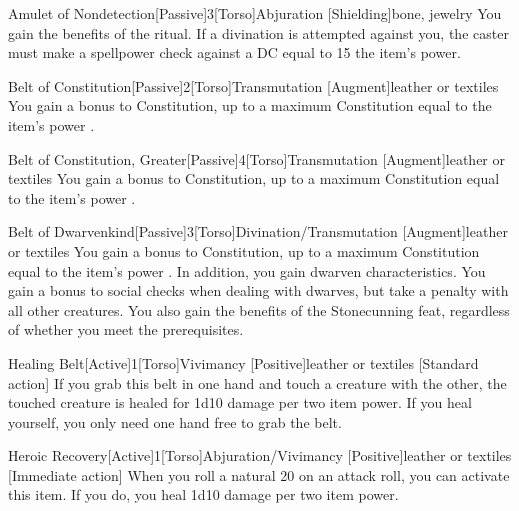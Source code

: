 \begin{magicitemdef}{Amulet of Nondetection}[Passive]{3}[Torso]{Abjuration [Shielding]}{bone, jewelry}
     You gain the benefits of the  ritual.
    If a divination is attempted against you, the caster must make a spellpower check against a DC equal to 15 \add the item's power.
\end{magicitemdef}

\begin{magicitemdef}{Belt of Constitution}[Passive]{2}[Torso]{Transmutation [Augment]}{leather or textiles}
     You gain a  bonus to Constitution, up to a maximum Constitution equal to the item's power .
\end{magicitemdef}

\begin{magicitemdef}{Belt of Constitution, Greater}[Passive]{4}[Torso]{Transmutation [Augment]}{leather or textiles}
     You gain a  bonus to Constitution, up to a maximum Constitution equal to the item's power .
\end{magicitemdef}

\begin{magicitemdef}{Belt of Dwarvenkind}[Passive]{3}[Torso]{Divination/Transmutation [Augment]}{leather or textiles}
     You gain a  bonus to Constitution, up to a maximum Constitution equal to the item's power .
    In addition, you gain dwarven characteristics.
    You gain a  bonus to social checks when dealing with dwarves, but take a  penalty with all other creatures.
    You also gain the benefits of the Stonecunning feat, regardless of whether you meet the prerequisites.
\end{magicitemdef}

\begin{magicitemdef}{Healing Belt}[Active]{1}[Torso]{Vivimancy [Positive]}{leather or textiles}
    [Standard action] If you grab this belt in one hand and touch a creature with the other, the touched creature is healed for 1d10 damage per two item power.
    If you heal yourself, you only need one hand free to grab the belt.
\end{magicitemdef}

\begin{magicitemdef}{Heroic Recovery}[Active]{1}[Torso]{Abjuration/Vivimancy [Positive]}{leather or textiles}
    [Immediate action] When you roll a natural 20 on an attack roll, you can activate this item. If you do, you heal 1d10 damage per two item power.
\end{magicitemdef}

